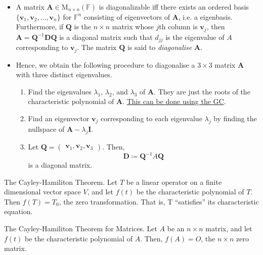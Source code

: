 \documentclass[../Notes.tex]{subfiles}
\begin{document}
\begin{stbox}{}
    \begin{itemize}
        \item A matrix \(\mathbf{A}\in\mathrm{M}_{n\times n}(\mathbb{F})\) is diagonalizable iff there exists an ordered basis \(\{\mathbf{v}_1,\mathbf{v}_2,\dots,\mathbf{v}_n\}\) for \(\mathbb{F}^n\) consisting of eigenvectors of \(\mathbf{A}\), i.e. a eigenbasis. Furthermore, if \(\mathbf{Q}\) is the \(n\times n\) matrix whose \(j\)th column is \(\mathbf{v}_j\), then \(\mathbf{A}=\mathbf{Q}^{-1}\mathbf{D}\mathbf{Q}\) is a diagonal matrix such that \(d_{jj}\) is the eigenvalue of \(A\) corresponding to \(\mathbf{v}_j\). The matrix \(\mathbf{Q}\) is said to \emph{diagonalise} \(\mathbf{A}\).
        \item Hence, we obtain the following procedure to diagonalise a \(3\times 3\) matrix \(\mathbf{A}\) with three distinct eigenvalues.
        \begin{enumerate}
            \item Find the eigenvalues \(\lambda_1\), \(\lambda_2\), and \(\lambda_3\) of \(\mathbf{A}\). They are just the roots of the characteristic polynomial of \(\mathbf{A}\). \hyperlink{characteristic-polynomial-roots}{This can be done using the GC}.
            \item Find an eigenvector \(\mathbf{v}_j\) corresponding to each eigenvalue \(\lambda_j\) by finding the nullspace of \(\mathbf{A}-\lambda_j\mathbf{I}
            \).
            \item Let \(\mathbf{Q}=
            \begin{pmatrix}
                \mathbf{v}_1,\mathbf{v}_2,\mathbf{v}_3
            \end{pmatrix}\). Then,
            \[\mathbf{D}\coloneq \mathbf{Q}^{-1}A\mathbf{Q}\]
            is a diagonal matrix.
        \end{enumerate} 
    \end{itemize}    
\end{stbox}
\begin{theorem}{The Cayley-Hamiliton Theorem.}{}
    Let \(T\) be a linear operator on a finite dimensional vector space \(V\), and let \(f(t)\) be the characteristic polynomial of \(T\). Then \(f(T)=T_0\), the zero transformation. That is, T ``satisfies'' its characteristic equation.
\end{theorem}
\begin{corollary}{The Cayley-Hamiliton Theorem for Matrices.}{}
    Let \(A\) be an \(n\times n\) matrix, and let \(f(t)\) be the characteristic polynomial of \(A\). Then, \(f(A)=O\), the \(n\times n\) zero matrix.  
\end{corollary}
\end{document}
